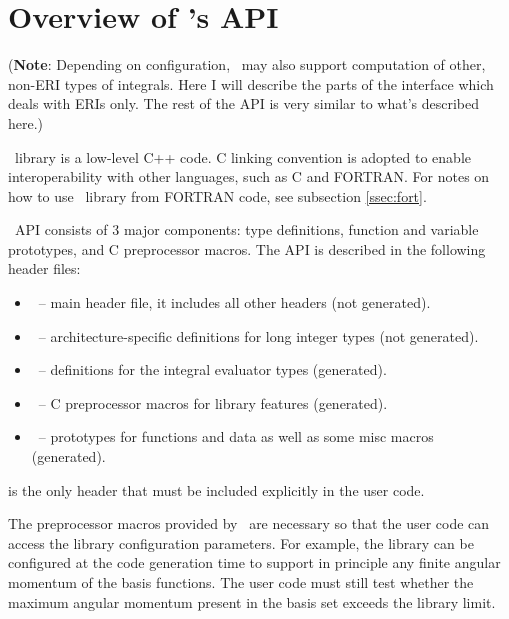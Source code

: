 \documentclass[12pt]{article}
\begin{document}
\section{Overview of \LIBINT 's API}

({\bf Note}: Depending on configuration, \LIBINT\ may also support computation of other, non-ERI types of integrals. Here I will describe
the parts of the interface which deals with ERIs only. The rest of the API is very similar to what's described here.)

\LIBINT\ library is a low-level C++ code. C linking convention is adopted to enable interoperability with other languages, such as C and FORTRAN.
For notes on how to use \LIBINT\ library from FORTRAN code, see subsection \ref{ssec:fort}.

\LIBINT\ API consists of 3 major components: type definitions, function and variable prototypes, and C preprocessor macros.
The API is described in the following header files:
\begin{itemize}
\item \libinth\ -- main header file, it includes all other headers (not generated).
\item \libintinttypesh\ -- architecture-specific definitions for long integer types (not generated).
\item \libinttypesh\ -- definitions for the integral evaluator types (generated).
\item \libintparamsh\ -- C preprocessor macros for library features (generated).
\item \libintifaceh\ -- prototypes for functions and data as well as some misc macros (generated).
\end{itemize}
\libinth is the only header that must be included explicitly in the user code.

The preprocessor macros provided by \libinth\ are necessary so that the user code can
access the library configuration parameters. For example, the library can be configured at the code generation time
to support in principle any finite angular momentum of the basis functions. The user code must still
test whether the maximum angular momentum present in the basis set exceeds the library limit.
\end{document}
